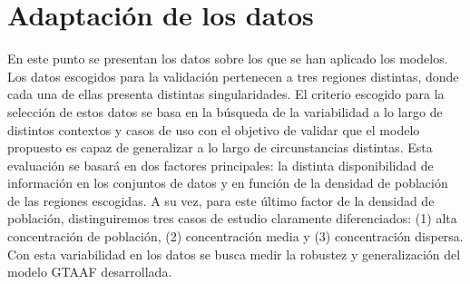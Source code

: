 \documentclass{uathesis-es}
\begin{document}
{%
    
    








\section{Adaptación de los datos}
\label{DATA_PRESENTATION_RESULTS}


En este punto se presentan los datos sobre los que se han aplicado los modelos. Los datos escogidos para la validación pertenecen a tres regiones distintas, donde cada una de ellas presenta distintas singularidades. El criterio escogido para la selección de estos datos se basa en la búsqueda de la variabilidad a lo largo de distintos contextos y casos de uso con el objetivo de validar que el modelo propuesto es capaz de generalizar a lo largo de circunstancias distintas. Esta evaluación se basará en dos factores principales: la distinta disponibilidad de información en los conjuntos de datos y en función de la densidad de población de las regiones escogidas. A su vez, para este último factor de la densidad de población, distinguiremos tres casos de estudio claramente diferenciados: (1) alta concentración de población, (2) concentración media y (3) concentración dispersa. Con esta variabilidad en los datos se busca medir la robustez y generalización del modelo GTAAF desarrollada.



}
\end{document}

